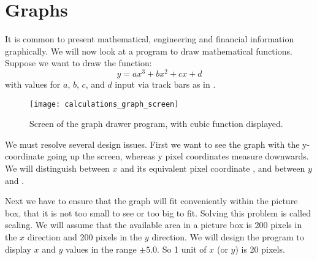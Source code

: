 	\section{Graphs}
		It is common to present mathematical, engineering and financial information graphically. We will now look at a program to draw mathematical functions. Suppose we want to draw the function:
		\begin{equation*}
			y = ax^3 + bx^2 + cx + d
		\end{equation*}
		with values for $a$, $b$, $c$, and $d$ input via track bars as in .

		\begin{figure}[bth]
			\centering
			\texttt{[image: calculations\_graph\_screen]}
			\caption{Screen of the graph drawer program, with cubic function displayed.}
			\label{fig:calculations_graph_screen}
		\end{figure}

		
		We must resolve several design issues. First we want to see the graph with the y-coordinate going up the screen, whereas y pixel coordinates measure downwards. We will distinguish between $x$ and its equivalent pixel coordinate , and between $y$ and .
		
		Next we have to ensure that the graph will fit conveniently within the picture box, that it is not too small to see or too big to fit. Solving this problem is called scaling. We will assume that the available area in a picture box is 200 pixels in the $x$ direction and 200 pixels in the $y$ direction. We will design the program to display $x$ and $y$ values in the range $\pm5.0$. So 1 unit of $x$ (or $y$) is 20 pixels.
		
